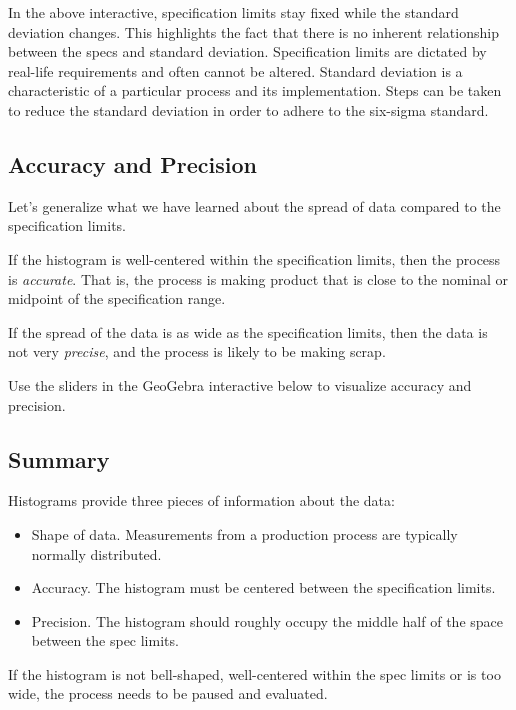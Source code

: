 \documentclass{ximera}
\begin{document}
\begin{onlineOnly}
\begin{center} 
\end{center}
\end{onlineOnly}

In the above interactive, specification limits stay fixed while the standard deviation changes.  This highlights the fact that there is no inherent relationship between the specs and standard deviation.  Specification limits are dictated by real-life requirements and often cannot be altered.  Standard deviation is a characteristic of a particular process and its implementation.  Steps can be taken to reduce the standard deviation in order to adhere to the six-sigma standard.

\subsection*{Accuracy and Precision}

Let's generalize what we have learned about the spread of data compared to the specification limits.

If the histogram is well-centered within the specification limits, then the process is \emph{accurate}. That is, the process is making product that is close to the nominal or midpoint of the specification range.

If the spread of the data is as wide as the specification limits, then the data is not very \emph{precise}, and the process is likely to be making scrap.

Use the sliders in the GeoGebra interactive below to visualize accuracy and precision.
\begin{onlineOnly}
\begin{center} 
\end{center}
\end{onlineOnly}

\subsection*{Summary}
Histograms provide three pieces of information about the data:
\begin{itemize}
    \item Shape of data.  Measurements from a production process are typically normally distributed.  
    \item Accuracy.  The histogram must be centered between the specification limits.  
    \item Precision.  The histogram should roughly occupy the middle half of the space between the spec limits. 
\end{itemize}
If the histogram is not bell-shaped, well-centered within the spec limits or is too wide, the process needs to be paused and evaluated.
\end{document}
